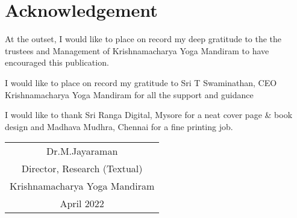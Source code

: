 \thispagestyle{empty}

\chapter*{Acknowledgement}\label{ack}

At the outset, I would like to place on record my deep gratitude to the the trustees and Management of Krishnamacharya Yoga Mandiram to have encouraged this publication.

I would like to place on record my gratitude to Sri T Swaminathan, CEO Krishnamacharya Yoga Mandiram for all the support and guidance

I would like to thank Sri Ranga Digital, Mysore for a neat cover page \& book design and Madhava Mudhra, Chennai for a fine printing job.

\begin{flushright}
	\begin{tabular}{c}
		Dr.M.Jayaraman\\
		Director, Research (Textual)\\
		Krishnamacharya Yoga Mandiram \\
		April 2022
	\end{tabular}
\end{flushright}
